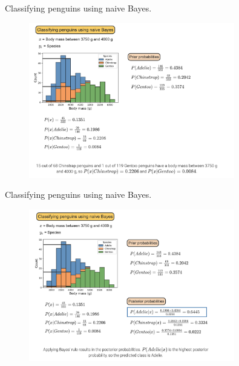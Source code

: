 \documentclass[10pt,dvipsnames]{beamer}
\begin{document}
\begin{frame}{Classifying penguins using naive Bayes.}
	\begin{figure}[ht]
		\centering
		\includegraphics[width=0.8\textwidth]{imgs/nb_12.png}
	\end{figure}
\end{frame}

\begin{frame}{Classifying penguins using naive Bayes.}
	\begin{figure}[ht]
		\centering
		\includegraphics[width=0.8\textwidth]{imgs/nb_13.png}
	\end{figure}
\end{frame}
\end{document}
